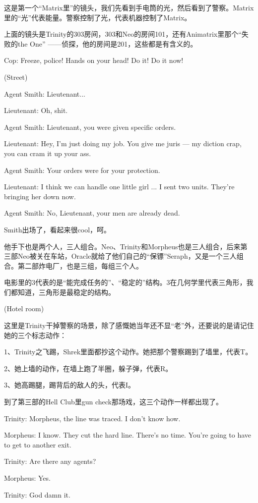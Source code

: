 \documentclass[UTF8]{ctexart}
\newenvironment{myquote}{\color{green} \setlength{\leftskip}{6em} \setlength{\rightskip}{4em} \setlength{\parindent}{-2em}}{\par}
\begin{document}
这是第一个“Matrix里”的镜头，我们先看到手电筒的光，然后看到了警察。Matrix里的“光”代表能量。警察控制了光，代表机器控制了Matrix。

上面的镜头是Trinity的303房间，303和Neo的房间101，还有Animatrix里那个“失败的the One” ——侦探，他的房间是201，这些都是有含义的。

\begin{myquote}
Cop: Freeze, police! Hands on your head! Do it! Do it now!

(Street)

Agent Smith: Lieutenant...

Lieutenant: Oh, shit.

Agent Smith: Lieutenant, you were given specific orders.

Lieutenant: Hey, I'm just doing my job. You give me juris --- my diction crap, you can cram it up your ass.

Agent Smith: Your orders were for your protection.

Lieutenant: I think we can handle one little girl ... I sent two units. They're bringing her down now.

Agent Smith: No, Lieutenant, your men are already dead.
\end{myquote}

Smith出场了，看起来很cool，呵。

他手下也是两个人，三人组合。Neo、Trinity和Morpheus也是三人组合，后来第三部Neo被关在车站，Oracle就给了他们自己的“保镖”Seraph，又是一个三人组合。第二部炸电厂，也是三组，每组三个人。

电影里的3代表的是“能完成任务的”、“稳定的”结构。3在几何学里代表三角形，我们都知道，三角形是最稳定的结构。

\begin{myquote}
(Hotel room)
\end{myquote}

这里是Trinity干掉警察的场景，除了感慨她当年还不显“老”外，还要说的是请记住她的三个标志动作：

1、Trinity之飞踢，Shrek里面都抄这个动作。她把那个警察踢到了墙里，代表T。

2、她上墙的动作，在墙上跑了半圈，躲子弹，代表R。

3、她高踢腿，踢背后的敌人的头，代表I。

到了第三部的Hell Club里gun check那场戏，这三个动作一样都出现了。

\begin{myquote}
Trinity: Morpheus, the line was traced. I don't know how.

Morpheus: I know. They cut the hard line. There's no time. You're going to have to get to another exit.

Trinity: Are there any agents?

Morpheus: Yes.

Trinity: God damn it.
\end{myquote}
\end{document}
